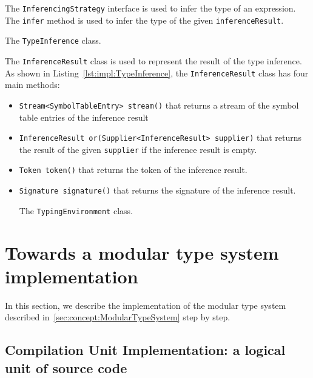 The \texttt{InferencingStrategy} interface is used to infer the type of an expression. The \texttt{infer} method is used to infer the type of the given \texttt{inferenceResult}.

\begin{Listing}[tbh]
    \centering
    \caption{The \texttt{TypeInference} class.}
    \label{lst:impl:TypeInference}
\end{Listing}

The \texttt{InferenceResult} class is used to represent the result of the type inference. As shown in Listing~\ref{lst:impl:TypeInference}, the \texttt{InferenceResult} class has four main methods:
\begin{itemize}
    \item \texttt{Stream<SymbolTableEntry> stream()} that returns a stream of the symbol table entries of the inference result
    \item \texttt{InferenceResult or(Supplier<InferenceResult> supplier)} that returns the result of the given \texttt{supplier} if the inference result is empty.
    \item \texttt{Token token()} that returns the token of the inference result.
    \item \texttt{Signature signature()} that returns the signature of the inference result.


\begin{Listing}[t]
    \centering
    \caption{The \texttt{TypingEnvironment} class.}
    \label{lst:impl:TypingEnvironment}
\end{Listing}

\end{itemize}

\section{Towards a modular type system implementation}\label{sec:impl:ModularTypeSystem}

In this section, we describe the implementation of the modular type system described in~\ref{sec:concept:ModularTypeSystem} step by step.

\subsection{Compilation Unit Implementation: a logical unit of source code}\label{subsec:impl:CompilationUnit}

